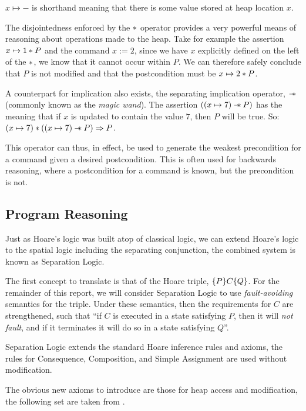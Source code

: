 \documentclass[a4paper,notitlepage]{report}
\begin{document}

  $x \mapsto -$ is shorthand meaning that there is some value stored at heap
  location $x$.

  The disjointedness enforced by the $\mathbin{*}$ operator provides a very powerful
  means of reasoning about operations made to the heap. Take for example the
  assertion $x \mapsto 1 \mathbin{*} P$ and the command $x := 2$, since we have $x$
  explicitly defined on the left of the $\mathbin{*}$, we know that it cannot occur
  within $P$. We can therefore safely conclude that $P$ is not modified and that
  the postcondition must be $x \mapsto 2 \mathbin{*} P$.

  A counterpart for implication also exists,
  the separating implication operator, $\mathbin{-\mkern-6mu *}$ (commonly known as the
  \emph{magic wand}). The assertion $((x
  \mapsto 7) \mathbin{-\mkern-6mu *} P)$ has the meaning that if $x$ is updated to contain the
  value $7$, then $P$ will be true. So: $(x \mapsto 7) \mathbin{*} ((x \mapsto 7) \mathbin{-\mkern-6mu *}
  P) \Rightarrow P$.

  This operator can thus, in effect, be
  used to generate the weakest precondition for a command given a desired
  postcondition. This is often used for backwards reasoning, where a
  postcondition for a command is known, but the precondition is not.

  \subsection{Program Reasoning}
  \label{subsec:programreasoning}

  Just as Hoare's logic was built atop of classical logic, we can extend
  Hoare's logic to the spatial logic including the separating conjunction,
  the combined system is known as Separation Logic.

  The first concept to translate is that of the Hoare triple, $\{P\}C\{Q\}$.
  For the remainder of this report, we will consider Separation Logic to use
  \emph{fault-avoiding} semantics for the triple. Under these semantics, then the
  requirements for $C$ are strengthened, such that ``if $C$ is executed in a
  state satisfying $P$, then it will \emph{not fault}, and if it terminates it
  will do so in a state satisfying $Q$''.

  Separation Logic extends the standard Hoare inference rules and axioms, the
  rules for Consequence, Composition, and Simple Assignment are used without
  modification.

  The obvious new axioms to introduce are those for heap access and
  modification, the following set are taken from \cite{OHearn2001Local}.
\end{document}
